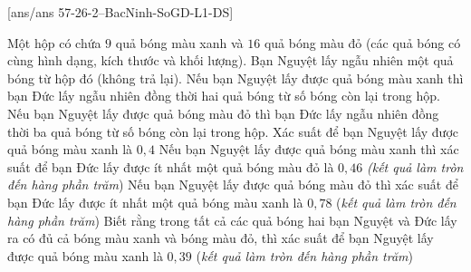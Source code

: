 \cauds
{}[ans/ans 57-26-2--BacNinh-SoGD-L1-DS]
\begin{ex}%
	Một hộp có chứa $9$ quả bóng màu xanh và $16$ quả bóng màu đỏ (các quả bóng có cùng hình dạng, kích thước và khối lượng). Bạn Nguyệt lấy ngẫu nhiên một quả bóng từ hộp đó (không trả lại). Nếu bạn Nguyệt lấy được quả bóng màu xanh thì bạn Đức lấy ngẫu nhiên đồng thời hai quả bóng từ số bóng còn lại trong hộp. Nếu bạn Nguyệt lấy được quả bóng màu đỏ thì bạn Đức lấy ngẫu nhiên đồng thời ba quả bóng từ số bóng còn lại trong hộp.
	\choiceTFt
	{Xác suất để bạn Nguyệt lấy được quả bóng màu xanh là $0{,}4$}
	{Nếu bạn Nguyệt lấy được quả bóng màu xanh thì xác suất để bạn Đức lấy được ít nhất một quả bóng màu đỏ là $0{,}46$ \textit{(kết quả làm tròn đến hàng phần trăm})}
	{\True Nếu bạn Nguyệt lấy được quả bóng màu đỏ thì xác suất để bạn Đức lấy được ít nhất một quả bóng màu xanh là $0{,}78$ (\textit{kết quả làm tròn đến hàng phần trăm})}
	{\True Biết rằng trong tất cả các quả bóng hai bạn Nguyệt và Đức lấy ra có đủ cả bóng màu xanh và bóng màu đỏ, thì xác suất để bạn Nguyệt lấy được quả bóng màu xanh là $0{,}39$ (\textit{kết quả làm tròn đến hàng phần trăm})}
\end{ex}
